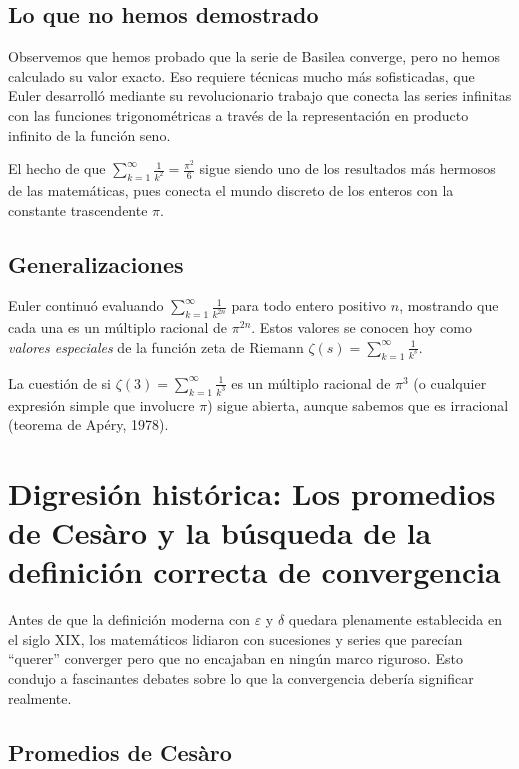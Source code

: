 \subsection{Lo que no hemos demostrado}

Observemos que hemos probado que la serie de Basilea converge, pero no hemos calculado su valor exacto. Eso requiere técnicas mucho más sofisticadas, que Euler desarrolló mediante su revolucionario trabajo que conecta las series infinitas con las funciones trigonométricas a través de la representación en producto infinito de la función seno.

El hecho de que $\sum_{k=1}^{\infty} \frac{1}{k^2} = \frac{\pi^2}{6}$ sigue siendo uno de los resultados más hermosos de las matemáticas, pues conecta el mundo discreto de los enteros con la constante trascendente $\pi$.

\subsection{Generalizaciones}

Euler continuó evaluando $\sum_{k=1}^{\infty} \frac{1}{k^{2n}}$ para todo entero positivo $n$, mostrando que cada una es un múltiplo racional de $\pi^{2n}$. Estos valores se conocen hoy como \emph{valores especiales} de la función zeta de Riemann $\zeta(s) = \sum_{k=1}^{\infty} \frac{1}{k^s}$.

La cuestión de si $\zeta(3) = \sum_{k=1}^{\infty} \frac{1}{k^3}$ es un múltiplo racional de $\pi^3$ (o cualquier expresión simple que involucre $\pi$) sigue abierta, aunque sabemos que es irracional (teorema de Ap\'ery, 1978).

\section{Digresión histórica: Los promedios de Cesàro y la búsqueda de la definición correcta de convergencia}

Antes de que la definición moderna con $\varepsilon$ y $\delta$ quedara plenamente establecida en el siglo XIX, los matemáticos lidiaron con sucesiones y series que parecían ``querer'' converger pero que no encajaban en ningún marco riguroso. Esto condujo a fascinantes debates sobre lo que la convergencia debería significar realmente.

\subsection{Promedios de Cesàro}

